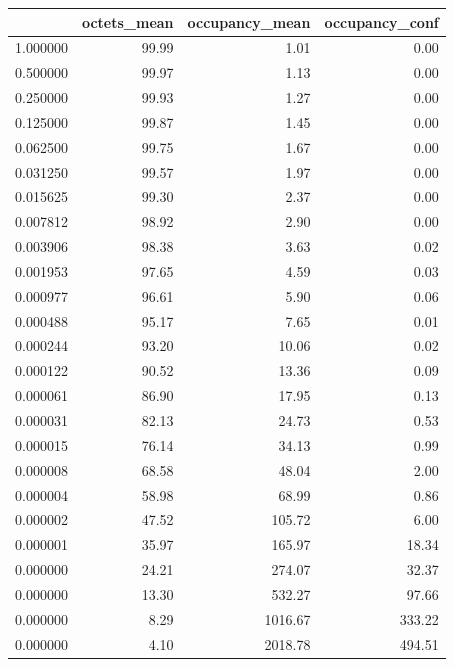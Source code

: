 \begin{tabular}{lrrr}
\toprule
 & octets_mean & occupancy_mean & occupancy_conf \\
\midrule
1.000000 & 99.99 & 1.01 & 0.00 \\
0.500000 & 99.97 & 1.13 & 0.00 \\
0.250000 & 99.93 & 1.27 & 0.00 \\
0.125000 & 99.87 & 1.45 & 0.00 \\
0.062500 & 99.75 & 1.67 & 0.00 \\
0.031250 & 99.57 & 1.97 & 0.00 \\
0.015625 & 99.30 & 2.37 & 0.00 \\
0.007812 & 98.92 & 2.90 & 0.00 \\
0.003906 & 98.38 & 3.63 & 0.02 \\
0.001953 & 97.65 & 4.59 & 0.03 \\
0.000977 & 96.61 & 5.90 & 0.06 \\
0.000488 & 95.17 & 7.65 & 0.01 \\
0.000244 & 93.20 & 10.06 & 0.02 \\
0.000122 & 90.52 & 13.36 & 0.09 \\
0.000061 & 86.90 & 17.95 & 0.13 \\
0.000031 & 82.13 & 24.73 & 0.53 \\
0.000015 & 76.14 & 34.13 & 0.99 \\
0.000008 & 68.58 & 48.04 & 2.00 \\
0.000004 & 58.98 & 68.99 & 0.86 \\
0.000002 & 47.52 & 105.72 & 6.00 \\
0.000001 & 35.97 & 165.97 & 18.34 \\
0.000000 & 24.21 & 274.07 & 32.37 \\
0.000000 & 13.30 & 532.27 & 97.66 \\
0.000000 & 8.29 & 1016.67 & 333.22 \\
0.000000 & 4.10 & 2018.78 & 494.51 \\
\bottomrule
\end{tabular}
